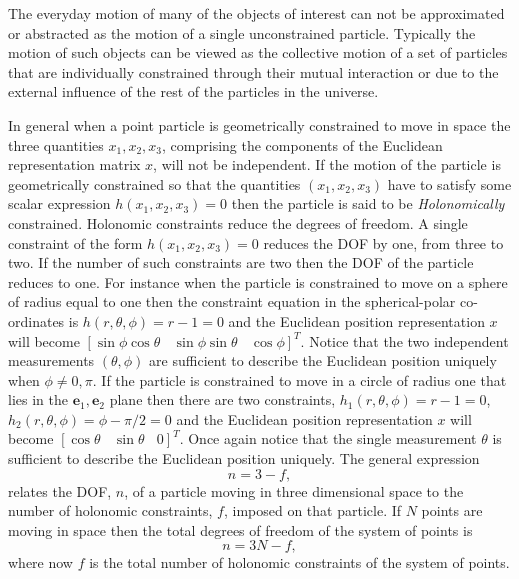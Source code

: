 \documentclass[graybox,envcountchap,sectrefs]{svmonoMuga}
\begin{document}
The everyday motion of many of the objects of interest can not be approximated or abstracted as the motion of a single unconstrained particle. Typically the motion of such objects 
can be viewed as the collective motion of a set of particles that are individually constrained through their mutual interaction or due to the external influence of the rest of the particles in the universe. 

In general when a point particle is geometrically constrained to move in space the three quantities $x_1,x_2,x_3$, comprising the components of the 
Euclidean representation matrix $x$, will not be independent. If the motion of the particle is geometrically constrained so that the quantities $(x_1,x_2,x_3)$ have to satisfy some 
scalar expression
$
h(x_1,x_2,x_3)=0
$
then the particle is said to be \textit{Holonomically} constrained. Holonomic constraints reduce the degrees of freedom. A single constraint of the form $
h(x_1,x_2,x_3)=0
$
reduces the DOF by one, from three to two. If the number of such constraints are two then the DOF of the particle reduces to one. For instance when the particle is constrained to 
move on a sphere of radius equal to one then the constraint equation in the spherical-polar co-ordinates is $h(r,\theta,\phi)=r-1=0$ and the Euclidean position representation $x$ will become $[\sin{\phi}
\cos{\theta}\:\:\:\:\sin{\phi}\sin{\theta}\:\:\:\:\cos{\phi}]^T$. Notice that the two independent measurements $(\theta,\phi)$ are sufficient to describe the Euclidean position uniquely when $
\phi\neq 0,\pi$. If the particle is constrained to move in a circle of radius one that lies in the $\mathbf{e}_1,\mathbf{e}_2$ plane then there are two constraints, $h_1(r,\theta,\phi)=r-1=0$, $h_2(r,\theta,
\phi)=\phi-\pi/2=0$ and the Euclidean position representation $x$ will become $[\cos{\theta}\:\:\:\:\sin{\theta}\:\:\:\:0]^T$. Once again notice that the single measurement $\theta$ is sufficient to describe the 
Euclidean position uniquely.
The general expression
\begin{equation}\label{eq:DOF_Point}
n=3-f,
\end{equation}
relates the DOF, $n$, of a particle moving in three dimensional space to the number of holonomic constraints, $f$, imposed on that particle.  If $N$ points are moving in space then the total degrees of freedom of the system of points is
\begin{equation}\label{eq:DOF_NPoints}
n=3N-f,
\end{equation}
where now $f$ is the total number of holonomic constraints of the system of points.
\end{document}
